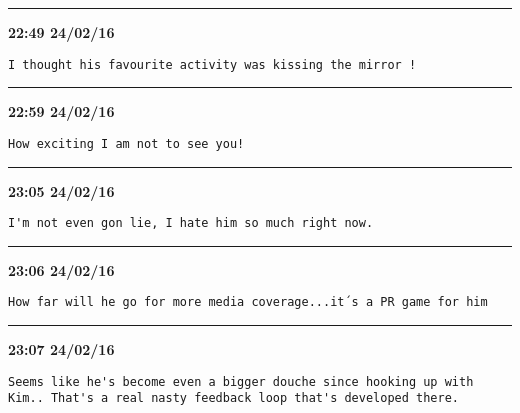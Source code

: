 \hrule%

\begin{adjustwidth}{0cm}{0cm}
\footnotesize \textbf{22:49 24/02/16}

\begin{lstlisting}[breaklines, breakatwhitespace, basicstyle=\small, frame=leftline]
I thought his favourite activity was kissing the mirror !
\end{lstlisting}
\end{adjustwidth}

\hrule%

\begin{adjustwidth}{0cm}{0cm}
\footnotesize \textbf{22:59 24/02/16}

\begin{lstlisting}[breaklines, breakatwhitespace, basicstyle=\small, frame=leftline]
How exciting I am not to see you!
\end{lstlisting}
\end{adjustwidth}

\hrule%

\begin{adjustwidth}{0cm}{0cm}
\footnotesize \textbf{23:05 24/02/16}

\begin{lstlisting}[breaklines, breakatwhitespace, basicstyle=\small, frame=leftline]
I'm not even gon lie, I hate him so much right now.
\end{lstlisting}
\end{adjustwidth}

\hrule%

\begin{adjustwidth}{0cm}{0cm}
\footnotesize \textbf{23:06 24/02/16}

\begin{lstlisting}[breaklines, breakatwhitespace, basicstyle=\small, frame=leftline]
How far will he go for more media coverage...it´s a PR game for him
\end{lstlisting}
\end{adjustwidth}

\hrule%

\begin{adjustwidth}{0cm}{0cm}
\footnotesize \textbf{23:07 24/02/16}

\begin{lstlisting}[breaklines, breakatwhitespace, basicstyle=\small, frame=leftline]
Seems like he's become even a bigger douche since hooking up with Kim.. That's a real nasty feedback loop that's developed there.
\end{lstlisting}
\end{adjustwidth}


